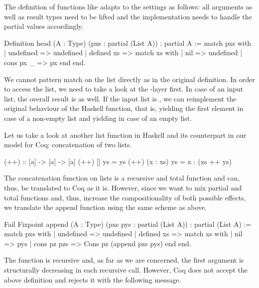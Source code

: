 The definition of  functions like  adapts to the settings as follows: all arguments as well as result types need to be lifted and the implementation needs to handle the partial values accordingly.

\begin{coqcode}
Definition head (A : Type) (pxs : partial (List A)) : partial A :=
  match pxs with
  | undefined  => undefined
  | defined xs => match xs with
                 | nil       => undefined
                 | cons px _ => px
                 end
  end.
\end{coqcode}

We cannot pattern match on the list directly as in the original definition.
In order to access the list, we need to take a look at the \--layer first.
In case of an  input list, the overall result is  as well.
If the input list is , we can reimplement the original behaviour of the Haskell function, that is, yielding the first element in case of a non\--empty list and yielding  in case of an empty list.

Let us take a look at another list function in Haskell and its counterpart in our model for Coq: concatenation of two lists.

\begin{haskellcode}
(++) :: [a] -> [a] -> [a]
(++) []       ys = ys
(++) (x : xs) ys = x : (xs ++ ys)
\end{haskellcode}

The concatenation function on lists is a recursive and total function and can, thus, be translated to Coq as it is.
However, since we want to mix partial and total functions and, thus, increase the compositionality of both possible effects, we translate the append function using the same scheme as above.

\begin{coqcode}
Fail Fixpoint append (A : Type) (pxs pys : partial (List A))
  : partial (List A) :=
  match pxs with
  | undefined  => undefined
  | defined xs => match xs with
                 | nil         => pys
                 | cons pz pzs => Cons pz (append pzs pys)
                 end
  end.
\end{coqcode}

The function  is recursive and, as far as we are concerned, the first argument is structurally decreasing in each
recursive call.
However, Coq does not accept the above definition and rejects it with the following message.

